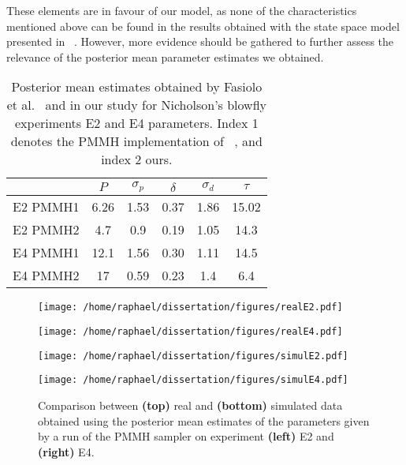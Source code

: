 \documentclass[12pt]{article}
\newcommand{\ra}[1]{\renewcommand{\arraystretch}{#1}}
\begin{document}
	These elements are in favour of our model, as none of the characteristics mentioned above can be found in the results obtained with the state space model presented in ~\cite{fasiolo2014statistical}. However, more evidence should be gathered to further assess the relevance of the posterior mean parameter estimates we obtained.
	
		\begin{table}[htb]
			\centering
			\vspace{10mm}
			\ra{1.3}
			\begin{tabular}{@{}cccccc@{}} \toprule
				 & $P$ & $\sigma_p$ & $\delta$ & $\sigma_d$ & $\tau$  \\ \midrule 
				E2 PMMH1 & 6.26 & 1.53 & 0.37 & 1.86 & 15.02 \\ 
				E2 PMMH2 & 4.7 & 0.9 & 0.19 & 1.05 & 14.3  \\ 
				E4 PMMH1 & 12.1 & 1.56 & 0.30 & 1.11 & 14.5 \\ 
				E4 PMMH2 & 17 & 0.59 & 0.23 & 1.4 & 6.4  \\ \bottomrule
			\end{tabular}
			\caption[Comparison between the posterior mean estimates of the parameters obtained in this study and in ~\cite{fasiolo2014statistical}, Nicholson's blowfly experiments 2 and 4]{Posterior mean estimates obtained by Fasiolo et al.~\cite{fasiolo2014statistical} and in our study for Nicholson's blowfly experiments E2 and E4 parameters. Index 1 denotes the PMMH implementation of ~\cite{fasiolo2014statistical}, and index 2 ours.}
			\label{table:posteriorBlow}
		\end{table}

	\begin{figure}[htb]
		\vspace{5mm}
		\centering
		\begin{minipage}{0.49\textwidth}
			\centering
			\texttt{[image: /home/raphael/dissertation/figures/realE2.pdf]}
		\end{minipage}
		\begin{minipage}{0.49\textwidth}
			\centering
			\texttt{[image: /home/raphael/dissertation/figures/realE4.pdf]}
		\end{minipage}
		\begin{minipage}{0.49\textwidth}
			\centering
			\texttt{[image: /home/raphael/dissertation/figures/simulE2.pdf]}
		\end{minipage}
		\begin{minipage}{0.49\textwidth}
			\centering
			\texttt{[image: /home/raphael/dissertation/figures/simulE4.pdf]}
		\end{minipage}
		\caption[Comparison between real and simulated data obtained using the posterior mean estimates of the parameters given by a run of the PMMH sampler, Nicholson's blowfly experiments E2 and E4]{Comparison between \textbf{(top)} real and \textbf{(bottom)} simulated data obtained using the posterior mean estimates of the parameters given by a run of the PMMH sampler on experiment \textbf{(left)} E2 and \textbf{(right)} E4.}
		\label{fig:compareblow}
		\vspace{5mm}
	\end{figure}
	
\end{document}
